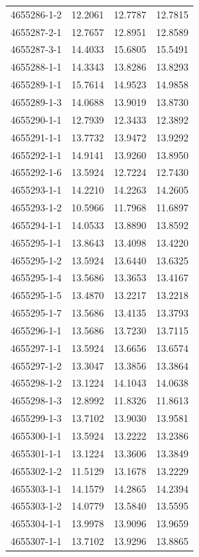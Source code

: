 \begin{longtable}{lrrr}
4655286-1-2 & 12.2061 & 12.7787 & 12.7815 \\
4655287-2-1 & 12.7657 & 12.8951 & 12.8589 \\
4655287-3-1 & 14.4033 & 15.6805 & 15.5491 \\
4655288-1-1 & 14.3343 & 13.8286 & 13.8293 \\
4655289-1-1 & 15.7614 & 14.9523 & 14.9858 \\
4655289-1-3 & 14.0688 & 13.9019 & 13.8730 \\
4655290-1-1 & 12.7939 & 12.3433 & 12.3892 \\
4655291-1-1 & 13.7732 & 13.9472 & 13.9292 \\
4655292-1-1 & 14.9141 & 13.9260 & 13.8950 \\
4655292-1-6 & 13.5924 & 12.7224 & 12.7430 \\
4655293-1-1 & 14.2210 & 14.2263 & 14.2605 \\
4655293-1-2 & 10.5966 & 11.7968 & 11.6897 \\
4655294-1-1 & 14.0533 & 13.8890 & 13.8592 \\
4655295-1-1 & 13.8643 & 13.4098 & 13.4220 \\
4655295-1-2 & 13.5924 & 13.6440 & 13.6325 \\
4655295-1-4 & 13.5686 & 13.3653 & 13.4167 \\
4655295-1-5 & 13.4870 & 13.2217 & 13.2218 \\
4655295-1-7 & 13.5686 & 13.4135 & 13.3793 \\
4655296-1-1 & 13.5686 & 13.7230 & 13.7115 \\
4655297-1-1 & 13.5924 & 13.6656 & 13.6574 \\
4655297-1-2 & 13.3047 & 13.3856 & 13.3864 \\
4655298-1-2 & 13.1224 & 14.1043 & 14.0638 \\
4655298-1-3 & 12.8992 & 11.8326 & 11.8613 \\
4655299-1-3 & 13.7102 & 13.9030 & 13.9581 \\
4655300-1-1 & 13.5924 & 13.2222 & 13.2386 \\
4655301-1-1 & 13.1224 & 13.3606 & 13.3849 \\
4655302-1-2 & 11.5129 & 13.1678 & 13.2229 \\
4655303-1-1 & 14.1579 & 14.2865 & 14.2394 \\
4655303-1-2 & 14.0779 & 13.5840 & 13.5595 \\
4655304-1-1 & 13.9978 & 13.9096 & 13.9659 \\
4655307-1-1 & 13.7102 & 13.9296 & 13.8865 \\

\end{longtable}
